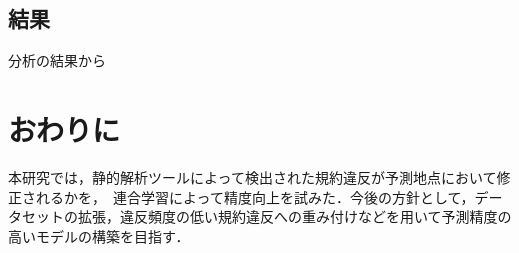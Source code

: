 \documentclass[uplatex,dvipdfmx,a4paper,twocolumn,base=11pt,jbase=11pt,ja=standard]{bxjsarticle}  %
\begin{document}
\begin{table}[t]
\vspace{0mm}
 \centering
 \caption{分析結果}
\label{tab:result3}
\end{table}



\subsection{結果}
分析の結果から~~~~~






\section{おわりに}

本研究では，静的解析ツールによって検出された規約違反が予測地点において修正されるかを，　連合学習によって精度向上を試みた．今後の方針として，データセットの拡張，違反頻度の低い規約違反への重み付けなどを用いて予測精度の高いモデルの構築を目指す．



\end{document}
